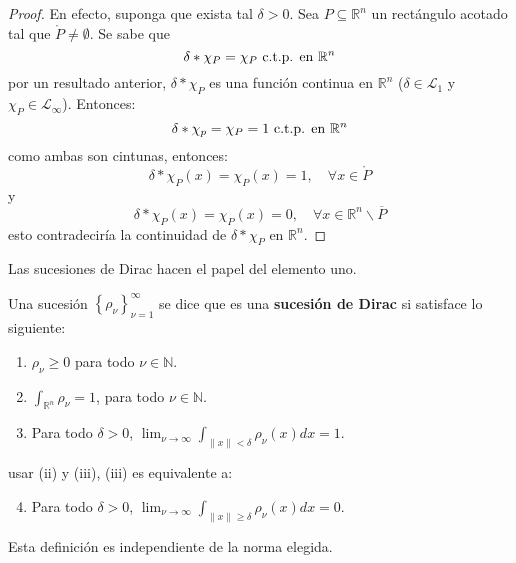 \documentclass[12pt]{report}
\theoremstyle{largebreak}
\newcommand\norm[1]{\ensuremath{\|#1\|}}
\begin{document}
    \begin{proof}
        En efecto, suponga que exista tal $\delta>0$. Sea $P\subseteq\mathbb{R}^n$ un rectángulo acotado tal que $\mathring{P}\neq\emptyset$. Se sabe que
        \begin{equation*}
            \delta*\chi_P=\chi_P\textup{ c.t.p. en }\mathbb{R}^n
        \end{equation*}
        por un resultado anterior, $\delta*\chi_P$ es una función continua en $\mathbb{R}^n$ ($\delta\in\mathcal{L}_1$ y $\chi_P\in\mathcal{L}_\infty$). Entonces:
        \begin{equation*}
            \delta*\chi_p=\chi_P=1\textup{ c.t.p. en }\mathbb{R}^n
        \end{equation*}
        como ambas son cintunas, entonces:
        \begin{equation*}
            \delta*\chi_P(x)=\chi_P(x)=1,\quad\forall x\in \mathring{P}
        \end{equation*}
        y
        \begin{equation*}
            \delta*\chi_P(x)=\chi_P(x)=0,\quad\forall x\in\mathbb{R}^n\backslash\overline{P}
        \end{equation*}
        esto contradeciría la continuidad de $\delta*\chi_P$ en $\mathbb{R}^n$.
    \end{proof}

    Las sucesiones de Dirac hacen el papel del elemento uno.

    \renewcommand{\theenumi}{\roman{enumi}}

    \begin{mydef}
        Una sucesión $\left\{\rho_\nu \right\}_{\nu=1}^\infty$ se dice que es una \textbf{sucesión de Dirac} si satisface lo siguiente:
        \begin{enumerate}
            \item $\rho_\nu\geq0$ para todo $\nu\in\mathbb{N}$.
            \item $\int_{\mathbb{R}^n}\rho_\nu=1$, para todo $\nu\in\mathbb{N}$.
            \item Para todo $\delta>0$, $\lim_{\nu\rightarrow\infty}\int_{\norm{x}<\delta}\rho_\nu(x)dx=1$.
        \end{enumerate}
        usar (ii) y (iii), (iii) es equivalente a:
        \begin{enumerate}
            \setcounter{enumi}{3}
            \item Para todo $\delta>0$, $\lim_{\nu\rightarrow\infty}\int_{\norm{x}\geq\delta}\rho_\nu(x)dx=0$.
        \end{enumerate}
        Esta definición es independiente de la norma elegida.
    \end{mydef}
\end{document}
